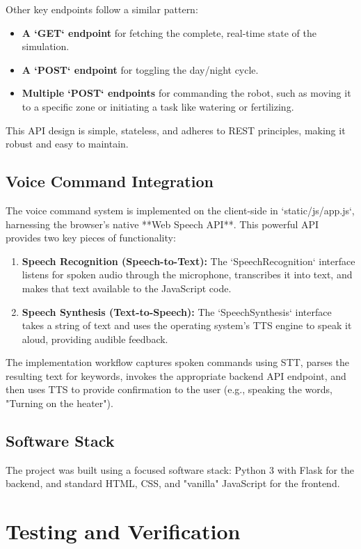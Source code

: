 \documentclass[12pt, a4paper]{report}
\begin{document}
Other key endpoints follow a similar pattern:
\begin{itemize}
    \item \textbf{A `GET` endpoint} for fetching the complete, real-time state of the simulation.
    \item \textbf{A `POST` endpoint} for toggling the day/night cycle.
    \item \textbf{Multiple `POST` endpoints} for commanding the robot, such as moving it to a specific zone or initiating a task like watering or fertilizing.
\end{itemize}
This API design is simple, stateless, and adheres to REST principles, making it robust and easy to maintain.

\section{Voice Command Integration}
The voice command system is implemented on the client-side in `static/js/app.js`, harnessing the browser's native **Web Speech API**. This powerful API provides two key pieces of functionality:
\begin{enumerate}
    \item \textbf{Speech Recognition (Speech-to-Text):} The `SpeechRecognition` interface listens for spoken audio through the microphone, transcribes it into text, and makes that text available to the JavaScript code.
    \item \textbf{Speech Synthesis (Text-to-Speech):} The `SpeechSynthesis` interface takes a string of text and uses the operating system's TTS engine to speak it aloud, providing audible feedback.
\end{enumerate}
The implementation workflow captures spoken commands using STT, parses the resulting text for keywords, invokes the appropriate backend API endpoint, and then uses TTS to provide confirmation to the user (e.g., speaking the words, "Turning on the heater").

\section{Software Stack}
The project was built using a focused software stack: Python 3 with Flask for the backend, and standard HTML, CSS, and "vanilla" JavaScript for the frontend.

\chapter{Testing and Verification}
\end{document}
